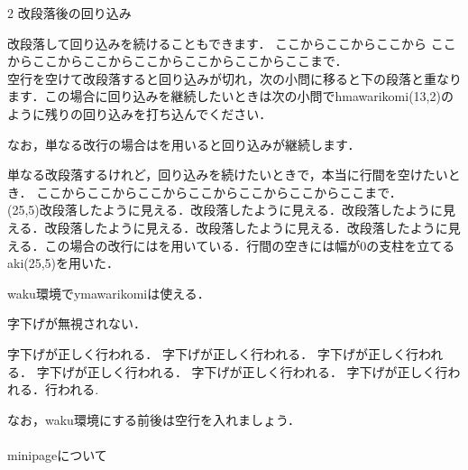 \documentclass[fleqn,a4paper,8pt,papersize]{jsarticlek}
\begin{document}
\begin{multicols}{2}
\kakkogob \quad 改段落後の回り込み

\quad 改段落して回り込みを続けることもできます．
%
ここからここからここから
ここからここからここからここからここからここからここまで．\\

空行を空けて改段落すると回り込みが切れ，次の小問に移ると下の段落と重なります．この場合に回り込みを継続したいときは次の小問でhmawarikomi(13,2)のように残りの回り込みを打ち込んでください．

なお，単なる改行の場合は\yy \yy を用いると回り込みが継続します．

単なる改段落するけれど，回り込みを続けたいときで，本当に行間を空けたいとき．
%
ここからここからここからここからここからここからここまで．\\
\aki(25,5)\quad 改段落したように見える．改段落したように見える．改段落したように見える．改段落したように見える．改段落したように見える．改段落したように見える．この場合の改行には\yy \yy を用いている．行間の空きには幅が0の支柱を立てるaki(25,5)を用いた．

\begin{waku}
\begin{reidai}
waku環境でymawarikomiは使える．
\begin{shomonr}
字下げが無視されない．
\end{shomonr}
\begin{shomonr}
%
字下げが正しく行われる．
字下げが正しく行われる．
字下げが正しく行われる．
字下げが正しく行われる．
字下げが正しく行われる．
字下げが正しく行われる．行われる.

\end{shomonr}
\end{reidai}
\end{waku}

なお，waku環境にする前後は空行を入れましょう．
\\
\\
\kakkorokub \quad minipageについて


\end{multicols}
\end{document}
